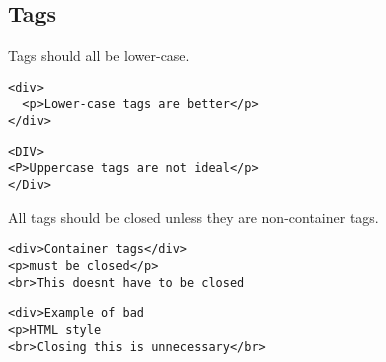 \documentclass[10pt,onecolumn]{witseiepaper}
\begin{document}
\subsection{\textbf{Tags}}

Tags should all be lower-case.

\begin{lstlisting}[backgroundcolor=\color{green!20}]
<div>
  <p>Lower-case tags are better</p>
</div>
\end{lstlisting}

\begin{lstlisting}[backgroundcolor=\color{red!20}]
<DIV>
<P>Uppercase tags are not ideal</p>
</Div>
\end{lstlisting}

All tags should be closed unless they are non-container tags.

\begin{lstlisting}[backgroundcolor=\color{green!20}]
<div>Container tags</div>
<p>must be closed</p>
<br>This doesnt have to be closed
\end{lstlisting}

\begin{lstlisting}[backgroundcolor=\color{red!20}]
<div>Example of bad 
<p>HTML style
<br>Closing this is unnecessary</br>
\end{lstlisting}
\end{document}
